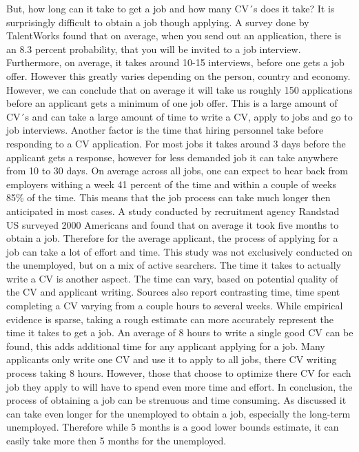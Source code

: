 But, how long can it take to get a job and how many CV´s does it take?
It is surprisingly difficult to obtain a job though applying.
A survey done by TalentWorks found that on average, when you send out an application, there is an 8.3 percent probability, that you will be invited to a job interview. 
Furthermore, on average, it takes around 10-15 interviews, before one gets a job offer. 
However this greatly varies depending on the person, country and economy.
However, we can conclude that on average it will take us roughly 150 applications before an applicant gets a minimum of one job offer.\cite{HR-sales}
This is a large amount of CV´s and can take a large amount of time to write a CV, apply to jobs and go to job interviews.
Another factor is the time that hiring personnel take before responding to a CV application.
For most jobs it takes around 3 days before the applicant gets a response, however for less demanded job it can take anywhere from 10 to 30 days.\cite{HR-sales}
On average across all jobs, one can expect to hear back from employers withing a week 41 percent of the time and within a couple of weeks 85\% of the time.
This means that the job process can take much longer then anticipated in most cases.
A study conducted by recruitment agency Randstad US surveyed 2000 Americans and found that on average it took five months to obtain a job.\cite{5_month_for_a_job}
Therefore for the average applicant, the process of applying for a job can take a lot of effort and time.
This study was not exclusively conducted on the unemployed, but on a mix of active searchers.
The time it takes to actually write a CV is another aspect.
The time can vary, based on potential quality of the CV and applicant writing.
Sources also report contrasting time, time spent completing a CV varying from a couple hours to several weeks.
While empirical evidence is sparse, taking a rough estimate can more accurately represent the time it takes to get a job.
An average of 8 hours to write a single good CV can be found, this adds additional time for any applicant applying for a job.
Many applicants only write one CV and use it to apply to all jobs, there CV writing process taking 8 hours.\cite{CV_Using_One}
However, those that choose to optimize there CV for each job they apply to will have to spend even more time and effort. 
In conclusion, the process of obtaining a job can be strenuous and time consuming.\cite{Time_spent_writing_CV}
As discussed it can take even longer for the unemployed to obtain a job, especially the long-term unemployed.
Therefore while 5 months is a good lower bounds estimate, it can easily take more then 5 months for the unemployed. \\

